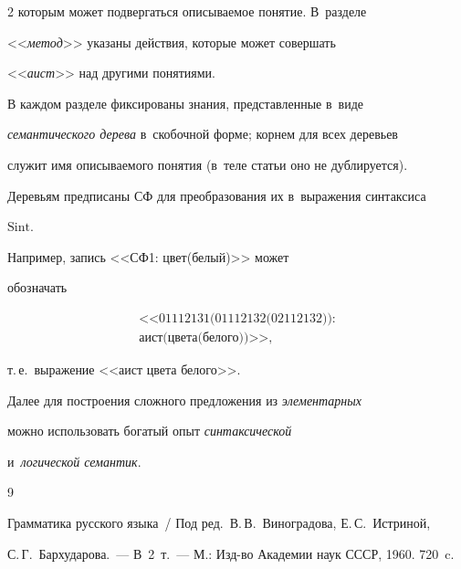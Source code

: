 \begin{multicols}{2}
которым может подвергаться опи\-сы\-ва\-емое понятие. В~разделе 

<<\textit{метод}>> указаны действия, которые может совершать 

<<\textit{аист}>> над другими понятиями. 

     

     В каждом разделе фиксированы знания, представленные в~виде 

\textit{семантического дерева} в~скобочной форме; корнем для всех деревьев 

служит имя описываемого понятия (в~теле статьи оно не дублируется). 

Деревьям предписаны СФ для преобразования их в~выражения синтаксиса 

$\mathrm{Sint}$.

     

     Например, запись <<{СФ}1: {цвет}({белый})>> может 

обозначать 

\begin{multline*}

\mbox{<<01112131(01112132(02112132)):}\\

\mbox{{аист}({цвета}({белого

}))>>},

\end{multline*}

 т.\,е.\ выражение <<{аист цвета белого}>>.

     

     Далее для построения сложного предложения из \textit{элементарных} 

можно использовать богатый опыт \textit{синтаксической} 

и~\textit{логической семантик}.

    

{\small\frenchspacing

 {%


 \begin{thebibliography}{9}


Грамматика русского языка~/ Под ред.\ В.\,В.~Виноградова, Е.\,С.~Истриной, 

С.\,Г.~Бархударова.~--- В~2~т.~--- М.: Изд-во Академии наук СССР, 1960. 720~c.



\end{thebibliography}}}
\end{multicols}
